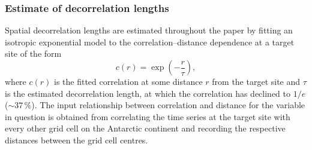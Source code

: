 \documentclass[cp, manuscript]{copernicus}
\begin{document}
\subsubsection{Estimate of decorrelation lengths}\label{methods:decor.model}

Spatial decorrelation lengths are estimated throughout the paper by fitting an
isotropic exponential model to the correlation--distance dependence at a target
site of the form
\begin{equation}\label{eq:decor.model}
c(r) = \exp{\left(-\frac{r}{\tau}\right)},
\end{equation}
where $c(r)$ is the fitted correlation at some distance $r$ from the target site
and $\tau$ is the estimated decorrelation length, at which the correlation has
declined to $1/e$ ($\sim37\,\%$). The input relationship between correlation and
distance for the variable in question is obtained from correlating the time
series at the target site with every other grid cell on the Antarctic continent
and recording the respective distances between the grid cell
centres.




















































% 
% 
\end{document}
